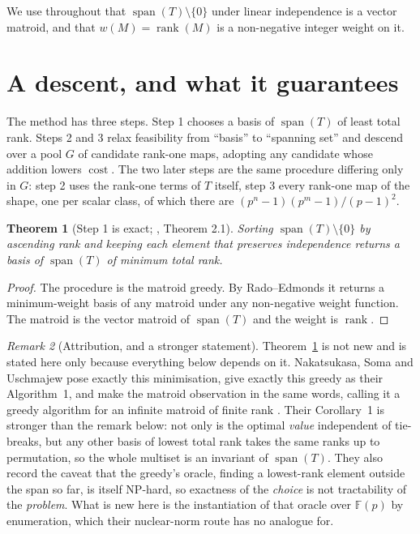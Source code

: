 \documentclass[11pt,reqno]{amsart}
\theoremstyle{plain}
\newtheorem{theorem}{Theorem}[section]
\theoremstyle{definition}
\theoremstyle{remark}
\newtheorem{remark}[theorem]{Remark}
\newcommand{\GF}{\mathbb{F}}
\newcommand{\rk}{\operatorname{rank}}
\newcommand{\spn}{\operatorname{span}}
\newcommand{\cost}{\operatorname{cost}}
\begin{document}
We use throughout that $\spn(T)\setminus\{0\}$ under linear independence is a
vector matroid, and that $w(M)=\rk(M)$ is a non-negative integer weight on it.

\section{A descent, and what it guarantees}\label{sec:descent}

The method has three steps. Step 1 chooses a basis of $\spn(T)$ of least total
rank. Steps 2 and 3 relax feasibility from ``basis'' to ``spanning set'' and
descend over a pool $G$ of candidate rank-one maps, adopting any candidate whose
addition lowers $\cost$. The two later steps are the same procedure differing
only in $G$: step 2 uses the rank-one terms of $T$ itself, step 3 every rank-one
map of the shape, one per scalar class, of which there are
$(p^{n}-1)(p^{m}-1)/(p-1)^2$.

\begin{theorem}[Step 1 is exact; \cite{nakatsukasa2017}, Theorem 2.1]\label{thm:greedy}
Sorting $\spn(T)\setminus\{0\}$ by ascending rank and keeping each element that
preserves independence returns a basis of $\spn(T)$ of minimum total rank.
\end{theorem}

\begin{proof}
The procedure is the matroid greedy. By Rado--Edmonds it returns a
minimum-weight basis of any matroid under any non-negative weight function. The
matroid is the vector matroid of $\spn(T)$ and the weight is $\rk$.
\end{proof}

\begin{remark}[Attribution, and a stronger statement]
Theorem~\ref{thm:greedy} is not new and is stated here only because everything
below depends on it. Nakatsukasa, Soma and Uschmajew pose exactly this
minimisation, give exactly this greedy as their Algorithm~1, and make the matroid
observation in the same words, calling it a greedy algorithm for an infinite
matroid of finite rank \cite{nakatsukasa2017}. Their Corollary~1 is stronger than
the remark below: not only is the optimal \emph{value} independent of tie-breaks,
but any other basis of lowest total rank takes the same ranks up to permutation,
so the whole multiset is an invariant of $\spn(T)$. They also record the caveat
that the greedy's oracle, finding a lowest-rank element outside the span so far,
is itself \textsc{NP}-hard, so exactness of the \emph{choice} is not tractability
of the \emph{problem}. What is new here is the instantiation of that oracle over
$\GF(p)$ by enumeration, which their nuclear-norm route has no analogue for.
\end{remark}
\end{document}
